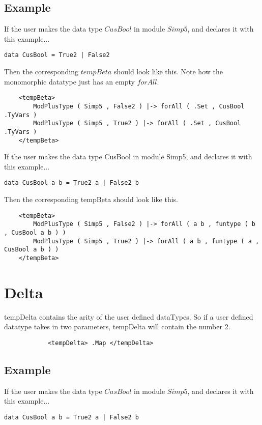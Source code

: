\subsection{Example}
If the user makes the data type $CusBool$ in module $Simp5$, and declares it with this example...
\begin{lstlisting}
data CusBool = True2 | False2
\end{lstlisting}

Then the corresponding $tempBeta$ should look like this. Note how the monomorphic datatype just has an empty $forAll$.

\begin{lstlisting}
    <tempBeta>
        ModPlusType ( Simp5 , False2 ) |-> forAll ( .Set , CusBool .TyVars )
        ModPlusType ( Simp5 , True2 ) |-> forAll ( .Set , CusBool .TyVars )
    </tempBeta>
\end{lstlisting}

If the user makes the data type CusBool in module Simp5, and declares it with this example...
\begin{lstlisting}
data CusBool a b = True2 a | False2 b
\end{lstlisting}

Then the corresponding tempBeta should look like this.
\begin{lstlisting}
    <tempBeta>
        ModPlusType ( Simp5 , False2 ) |-> forAll ( a b , funtype ( b , CusBool a b ) )
        ModPlusType ( Simp5 , True2 ) |-> forAll ( a b , funtype ( a , CusBool a b ) )
    </tempBeta>

\end{lstlisting}

\section{Delta}

tempDelta contains the arity of the user defined dataTypes. So if a user defined datatype takes in two parameters, tempDelta will contain the number 2.

\begin{lstlisting}
            <tempDelta> .Map </tempDelta>
\end{lstlisting}

\subsection{Example}
If the user makes the data type $CusBool$ in module $Simp5$, and declares it with this example...
\begin{lstlisting}
data CusBool a b = True2 a | False2 b
\end{lstlisting}

